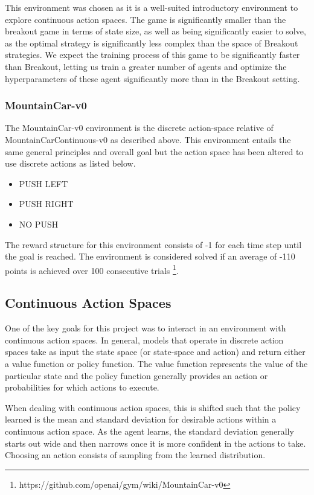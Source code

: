 \documentclass[conference]{IEEEtran}
\begin{document}
This environment was chosen as it is a well-suited introductory environment to explore continuous action spaces.
The game is significantly smaller than the breakout game in terms of state size, as well as being significantly easier to solve, as the optimal strategy is significantly less complex than the space of Breakout strategies.
We expect the training process of this game to be significantly faster than Breakout, letting us train a greater number of agents and optimize the hyperparameters of these agent significantly more than in the Breakout setting.

\subsubsection{MountainCar-v0}
The MountainCar-v0 environment is the discrete action-space relative of MountainCarContinuous-v0 as described above.
This environment entails the same general principles and overall goal but the action space has been altered to use discrete actions as listed below.

\begin{itemize}
    \item PUSH LEFT
    \item PUSH RIGHT
    \item NO PUSH
\end{itemize}

The reward structure for this environment consists of -1 for each time step until the goal is reached.
The environment is considered solved if an average of -110 points is achieved over 100 consecutive trials \footnote{https://github.com/openai/gym/wiki/MountainCar-v0}.

\subsection{Continuous Action Spaces}
One of the key goals for this project was to interact in an environment with continuous action spaces.
In general, models that operate in discrete action spaces take as input the state space (or state-space and action) and return either a value function or policy function.
The value function represents the value of the particular state and the policy function generally provides an action or probabilities for which actions to execute.

When dealing with continuous action spaces, this is shifted such that the policy learned is the mean and standard deviation for desirable actions within a continuous action space.
As the agent learns, the standard deviation generally starts out wide and then narrows once it is more confident in the actions to take.
Choosing an action consists of sampling from the learned distribution.
\end{document}
